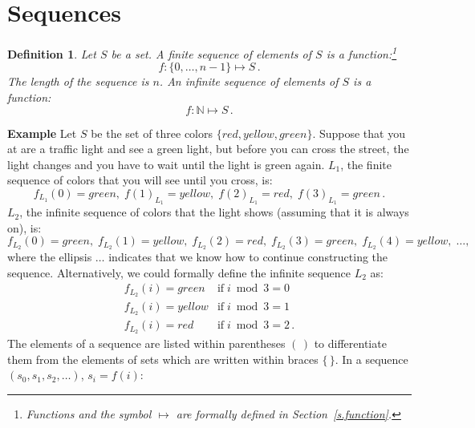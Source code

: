 \documentclass[12pt,a4paper]{article}
\newtheorem{definition}[theorem]{Definition}
\newenvironment{example}{\textbf{Example}}{}
\begin{document}
\section{Sequences}

\begin{definition}\label{def.sequences}
Let $S$ be a set. A \emph{finite sequence of elements of $S$} is a function:\footnote{\emph{Functions} and the symbol $\mapsto$ are formally defined in Section~\ref{s.function}.}
\[
f:\{0,\ldots,n-1\}\mapsto S\,.
\]
The \emph{length} of the sequence is $n$. An \emph{infinite sequence of elements of $S$} is a function:
\[
f:\mathbb{N}\mapsto S\,.
\]
\end{definition}

\begin{example}
Let $S$ be the set of three colors $\{\mathit{red},
\mathit{yellow}, \mathit{green}\}$. Suppose that you at are a traffic light and see a green light, but before you can cross the street, the light changes and you have to wait until the light is green again. $L_1$, the finite sequence of colors that you will see until you cross, is:
\begin{displaymath}
f_{L_1}(0)=\mathit{green},\; f(1)_{L_1}=\mathit{yellow},\; f(2)_{L_1}=\mathit{red},\; f(3)_{L_1}=\mathit{green}\,.
\end{displaymath}
$L_2$, the infinite sequence of colors that the light shows (assuming that it is always on), is:
\begin{displaymath}
f_{L_2}(0)=\mathit{green},\; f_{L_2}(1)=\mathit{yellow},\; f_{L_2}(2)=\mathit{red},\; f_{L_2}(3)=\mathit{green},\; f_{L_2}(4)=\mathit{yellow},\; \ldots,
\end{displaymath}
where the ellipsis $\ldots$ indicates that we know how to continue
constructing the sequence. Alternatively, we could formally define the infinite
sequence $L_2$ as:
\begin{displaymath}
\begin{array}{ll}
f_{L_2}(i)=\mathit{green}&\mathrm{if}\; i\bmod 3 = 0\\
f_{L_2}(i)=\mathit{yellow}&\mathrm{if}\; i\bmod 3 = 1\\
f_{L_2}(i)=\mathit{red}&\mathrm{if}\; i\bmod 3 = 2\,.
\end{array}
\end{displaymath}
\end{example}
The elements of a sequence are listed within parentheses $(\,)$ to differentiate them from the elements of sets which are written within braces $\{\,\}$. In a sequence $(s_0, s_1, s_2, \ldots)$, $s_i=f(i)$:
\end{document}
